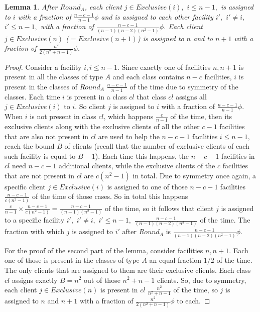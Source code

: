 \documentclass[11pt]{article}\usepackage{amsmath}
\newtheorem{lemma}{Lemma}[section]
\begin{document}
\begin{lemma}  \label{lemma:roundA}
After  $Round_A$,  each client  $j  \in  Exclusive(i),$  $i\leq n-1,$  is
assigned to $i$  with a fraction of $\frac{n-c-1}{n-1}  \phi$ and is
assigned to each other facility $i',$ $i' \neq i,$ $i' \leq  n-1,$ with a
fraction of $\frac{n-c-1}{(n-1)(n-2)(n^2-1)} \phi$. Each client $j \in
Exclusive(n)$ ($=Exclusive(n+1)$)   is   assigned   to   $n$ and to $n+1$ 
 with   a   fraction   of $\frac{n^2}{2(n^2+n-1)} \phi$.
\end{lemma}

\begin{proof}
Consider a facility  $i, i\leq n-1$. Since exactly one of facilities  $n,n+1$ is present in
all the classes of type  $A$ and each class contains $n-c$ facilities,
$i$ is  present in the  classes of $Round_A$  $\frac{n-c-1}{n-1}$ of
the time due to symmetry of the classes. Each time $i$ is present in
a class  $cl$ that  class $cl$ assigns  all $j \in  Exclusive(i)$ to
$i$.  So  client  $j$  is  assigned  to $i$  with  a  fraction  of
$\frac{n-c-1}{n-1}  \phi$. When $i$  is not  present in  class $cl$,
which happens  $\frac{c}{n-1}$ of the time, then  its exclusive clients
along with  the exclusive  clients of all  the other  $c-1$ facilities
that  are also  not  present in  $cl$  are used  to  help the  $n-c-1$
facilities $i \leq n-1,$  reach the bound $B$ of clients (recall
that the number of exclusive clients of each such facility is equal to
$B-1$).  Each time  this happens, the $n-c-1$ facilities  in $cl$ need
$n-c-1$  additional clients, while  the exclusive  clients of  the $c$
facilities that are  not present in $cl$ are  $c(n^2-1)$ in total. Due
to symmetry  once again, a  specific client $j \in  Exclusive(i)$ is
assigned to  one of those  $n-c-1$ facilities $\frac{n-c-1}{c(n^2-1)}$
of the  time of those cases.  So in total  this happens $\frac{c}{n-1}
\times  \frac{n-c-1}{c(n^2-1)}  =  \frac{n-c-1}{(n-1)(n^2-1)}$ of  the
time, so it follows that client $j$ is assigned to a specific facility
$i',$ $i' \neq i,$ $i' \leq n-1,$ $\frac{n-c-1}{(n-1)(n-2)(n^2-1)}$ of the
time. The fraction with which  $j$ is assigned to $i'$ after $Round_A$
is $\frac{n-c-1}{(n-1)(n-2)(n^2-1)} \phi$.

For  the proof  of the  second part  of the  lemma,  consider facilities
$n,n+1$. Each one of those is present in the classes of type $A$ an equal 
fraction $1/2$ of the time. The
only clients that  are assigned to them are  their exclusive clients. Each
class $cl$ assigns exactly $B= n^2$ out of those $n^2+n-1$ clients. So,
due to symmetry, each client $j \in Exclusive(n)$ is present in
$cl$ $\frac{n^2}{n^2+n-1}$  of the time,  so $j$ is assigned to $n$ and $n+1$
with a fraction of $\frac{n^2}{2(n^2+n-1)} \phi$ to each.
\end{proof}
\end{document}
